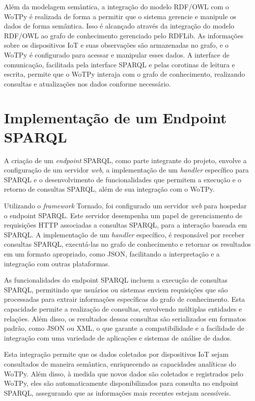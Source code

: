 Além da modelagem semântica, a integração do modelo RDF/OWL com o WoTPy é realizada de forma a permitir que o sistema gerencie e manipule os dados de forma semântica. Isso é alcançado através da integração do modelo RDF/OWL ao grafo de conhecimento gerenciado pelo RDFLib. As informações sobre os dispositivos IoT e suas observações são armazenadas no grafo, e o WoTPy é configurado para acessar e manipular esses dados. A interface de comunicação, facilitada pela interface SPARQL e pelas corotinas de leitura e escrita, permite que o WoTPy interaja com o grafo de conhecimento, realizando consultas e atualizações nos dados conforme necessário.

\section{Implementação de um Endpoint SPARQL}

A criação de um \textit{endpoint} SPARQL, como parte integrante do projeto, envolve a configuração de um servidor \textit{web}, a implementação de um \textit{handler} específico para SPARQL e o desenvolvimento de funcionalidades que permitem a execução e o retorno de consultas SPARQL, além de sua integração com o WoTPy.

Utilizando o \textit{framework} Tornado, foi configurado um servidor \textit{web} para hospedar o endpoint SPARQL. Este servidor desempenha um papel de gerenciamento de requisições HTTP associadas a consultas SPARQL, para a interação baseada em SPARQL. A implementação de um \textit{handler} específico, é responsável por receber consultas SPARQL, executá-las no grafo de conhecimento e retornar os resultados em um formato apropriado, como JSON, facilitando a interpretação e a integração com outras plataformas.

As funcionalidades do endpoint SPARQL incluem a execução de consultas SPARQL, permitindo que usuários ou sistemas enviem requisições que são processadas para extrair informações específicas do grafo de conhecimento. Esta capacidade  permite a realização de consultas, envolvendo múltiplas entidades e relações. Além disso, os resultados dessas consultas são serializados em formatos padrão, como JSON ou XML, o que garante a compatibilidade e a facilidade de integração com uma variedade de aplicações e sistemas de análise de dados.

Esta integração permite que os dados coletados por dispositivos IoT sejam consultados de maneira semântica, enriquecendo as capacidades analíticas do WoTPy. Além disso, à medida que novos dados são coletados e registrados pelo WoTPy, eles são automaticamente disponibilizados para consulta no endpoint SPARQL, assegurando que as informações mais recentes estejam acessíveis.

